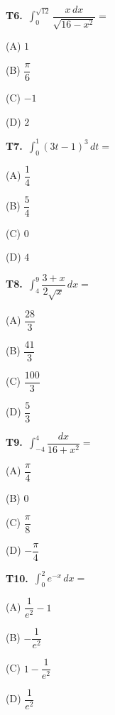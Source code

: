 \documentclass[11pt]{article}
\begin{document}
\bigskip\noindent\textbf{T6.}\ $\displaystyle\int_{0}^{\sqrt{12}} \dfrac{x\,dx}{\sqrt{16-x^2}} =$
\begin{list}{}{\setlength{\leftmargin}{3em}\setlength{\labelwidth}{2.5em}\setlength{\itemsep}{0pt}\setlength{\topsep}{2pt}}
\item[(A)] $1$
\item[(B)] $\dfrac{\pi}{6}$
\item[(C)] $-1$
\item[(D)] $2$
\end{list}

\bigskip\noindent\textbf{T7.}\ $\displaystyle\int_{0}^{1} (3t-1)^3\,dt =$
\begin{list}{}{\setlength{\leftmargin}{3em}\setlength{\labelwidth}{2.5em}\setlength{\itemsep}{0pt}\setlength{\topsep}{2pt}}
\item[(A)] $\dfrac{1}{4}$
\item[(B)] $\dfrac{5}{4}$
\item[(C)] $0$
\item[(D)] $4$
\end{list}

\bigskip\noindent\textbf{T8.}\ $\displaystyle\int_{4}^{9} \dfrac{3+x}{2\sqrt{x}}\,dx =$
\begin{list}{}{\setlength{\leftmargin}{3em}\setlength{\labelwidth}{2.5em}\setlength{\itemsep}{0pt}\setlength{\topsep}{2pt}}
\item[(A)] $\dfrac{28}{3}$
\item[(B)] $\dfrac{41}{3}$
\item[(C)] $\dfrac{100}{3}$
\item[(D)] $\dfrac{5}{3}$
\end{list}

\bigskip\noindent\textbf{T9.}\ $\displaystyle\int_{-4}^{4} \dfrac{dx}{16+x^2} =$
\begin{list}{}{\setlength{\leftmargin}{3em}\setlength{\labelwidth}{2.5em}\setlength{\itemsep}{0pt}\setlength{\topsep}{2pt}}
\item[(A)] $\dfrac{\pi}{4}$
\item[(B)] $0$
\item[(C)] $\dfrac{\pi}{8}$
\item[(D)] $-\dfrac{\pi}{4}$
\end{list}

\bigskip\noindent\textbf{T10.}\ $\displaystyle\int_{0}^{2} e^{-x}\,dx =$
\begin{list}{}{\setlength{\leftmargin}{3em}\setlength{\labelwidth}{2.5em}\setlength{\itemsep}{0pt}\setlength{\topsep}{2pt}}
\item[(A)] $\dfrac{1}{e^2}-1$
\item[(B)] $-\dfrac{1}{e^2}$
\item[(C)] $1-\dfrac{1}{e^2}$
\item[(D)] $\dfrac{1}{e^2}$
\end{list}
\end{document}
